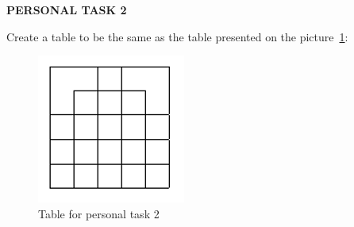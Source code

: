 \documentclass[a4paper]{article}
\begin{document}
\vspace{2cm}

\textbf{PERSONAL TASK 2}
\bigskip
\rm

Create a table to be the same as the table presented on the picture~\ref{tab:Pers_Task_2}:

\begin{figure}
    \centering
    \includegraphics[scale=1]{Table}
    \caption{Table for personal task 2}
    \label{tab:Pers_Task_2}
\end{figure}
\end{document}
